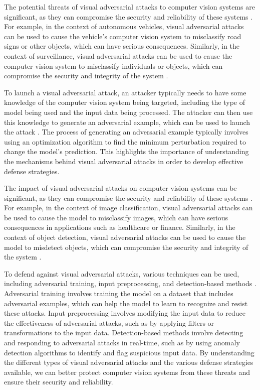 \documentclass[11pt]{article}
\begin{document}
The potential threats of visual adversarial attacks to computer vision systems are significant, as they can compromise the security and reliability of these systems \cite{ref5}. For example, in the context of autonomous vehicles, visual adversarial attacks can be used to cause the vehicle's computer vision system to misclassify road signs or other objects, which can have serious consequences. Similarly, in the context of surveillance, visual adversarial attacks can be used to cause the computer vision system to misclassify individuals or objects, which can compromise the security and integrity of the system \cite{ref6}.

To launch a visual adversarial attack, an attacker typically needs to have some knowledge of the computer vision system being targeted, including the type of model being used and the input data being processed. The attacker can then use this knowledge to generate an adversarial example, which can be used to launch the attack \cite{ref7}. The process of generating an adversarial example typically involves using an optimization algorithm to find the minimum perturbation required to change the model's prediction. This highlights the importance of understanding the mechanisms behind visual adversarial attacks in order to develop effective defense strategies.

The impact of visual adversarial attacks on computer vision systems can be significant, as they can compromise the security and reliability of these systems \cite{ref8}. For example, in the context of image classification, visual adversarial attacks can be used to cause the model to misclassify images, which can have serious consequences in applications such as healthcare or finance. Similarly, in the context of object detection, visual adversarial attacks can be used to cause the model to misdetect objects, which can compromise the security and integrity of the system \cite{ref9}.

To defend against visual adversarial attacks, various techniques can be used, including adversarial training, input preprocessing, and detection-based methods \cite{ref10}. Adversarial training involves training the model on a dataset that includes adversarial examples, which can help the model to learn to recognize and resist these attacks. Input preprocessing involves modifying the input data to reduce the effectiveness of adversarial attacks, such as by applying filters or transformations to the input data. Detection-based methods involve detecting and responding to adversarial attacks in real-time, such as by using anomaly detection algorithms to identify and flag suspicious input data. By understanding the different types of visual adversarial attacks and the various defense strategies available, we can better protect computer vision systems from these threats and ensure their security and reliability.
\end{document}
